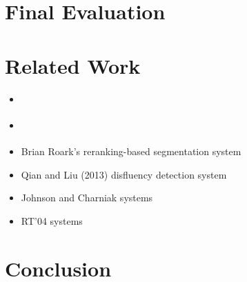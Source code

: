 \documentclass[11pt,letterpaper]{article}
\begin{document}







\section{Final Evaluation}

\newpage

\section{Related Work}

\begin{itemize}
    \item \citet{honnibal:14}
    \item \citet{rasooli:13}
    \item Brian Roark's reranking-based segmentation system
    \item Qian and Liu (2013) disfluency detection system
    \item Johnson and Charniak systems
    \item RT'04 systems
\end{itemize}

\newpage

\section{Conclusion}

\newpage



\end{document}
